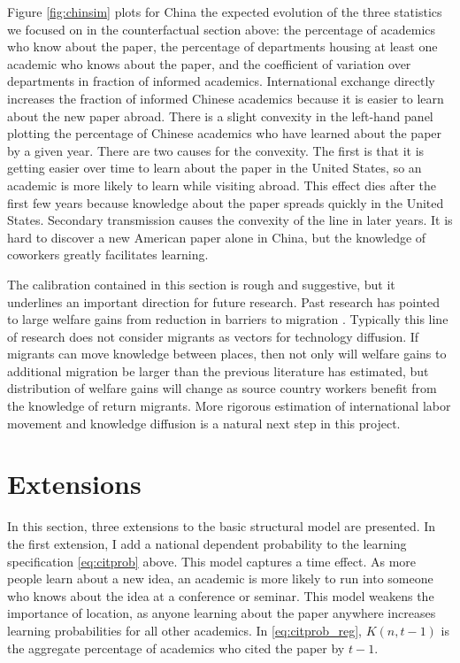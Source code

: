Figure \ref{fig:chinsim} plots for China the expected evolution of the three 
statistics we focused on in the counterfactual section above: the percentage of academics
who know about the paper, the percentage of departments housing at least one academic 
who knows about the paper, and the coefficient of variation over departments in fraction 
of informed academics.  International exchange
 directly increases the fraction of informed Chinese academics because it is
 easier to learn about the new paper abroad.  There is a slight convexity in the 
left-hand panel plotting the percentage of Chinese academics who have learned about
the paper by a given year.
There are two causes for the convexity.  The first is that it is getting easier 
over time to learn about the paper in the United States, so an academic is more likely
to learn while visiting abroad.  This effect dies after the first few years because
knowledge about the paper spreads quickly in the United States.  Secondary transmission
causes the convexity of the line in later years.  It is hard
to discover a new American paper alone in China, but the knowledge of coworkers greatly
facilitates learning.

The calibration contained in this section is rough and suggestive, but it underlines an important
 direction for future research.  Past research has pointed to large welfare gains from
reduction in barriers to migration \citep{clemens2011economics}.  Typically this
 line of research does not consider migrants as vectors for technology diffusion.  If migrants 
can move knowledge between places, then not only will welfare gains to additional
migration be larger than the previous literature has estimated, but distribution of welfare gains 
will change as source country workers benefit from the knowledge
of return migrants.  More rigorous estimation of international labor movement and
 knowledge diffusion is a natural next step in this project.

\section{Extensions}
\label{sec:extensions}

In this section, three extensions to the basic structural model are
presented. In the first extension, I add a national dependent probability
to the learning specification \eqref{eq:citprob} above. This model
captures a time effect.  As more people learn about a new idea, an academic is more likely to run into
someone who knows about the idea at a conference or seminar. This model weakens the importance of location,
as anyone learning about the paper anywhere increases learning probabilities for all other academics.  In
\eqref{eq:citprob_reg}, $K(n,t-1)$ is the aggregate percentage of academics who cited the paper by $t-1$.

